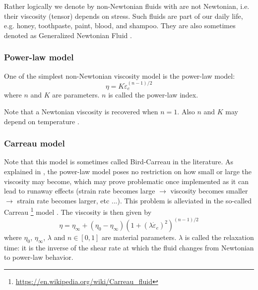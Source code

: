 Rather logically we denote by non-Newtonian fluids with are not Newtonian, i.e. their viscosity (tensor)
depends on stress. Such fluids are part of our daily life, e.g. honey, toothpaste, paint, blood, and shampoo.
They are also sometimes denoted as Generalized Newtonian Fluid . 
 


\subsubsection{Power-law model} 

One of the simplest non-Newtonian viscosity model is the power-law model:
\begin{equation}
\eta = K \dot{\varepsilon}_{e}^{(n-1)/2}
\end{equation}
where $n$ and $K$ are parameters. $n$ is called the power-law index.

Note that a Newtonian viscosity is recovered when $n=1$. Also $n$ and $K$ may depend on temperature
\cite[p339]{reddybook2}.

\Literature \cite{enmo97}

\subsubsection{Carreau model}

Note that this model is sometimes called Bird-Carreau in the literature. 
As explained in \cite{reddybook2}, the power-law model poses no restriction on 
how small or large the viscosity may become, which may prove problematic once 
implemented as it can lead to runaway effects (strain rate becomes large $\rightarrow$
viscosity becomes smaller $\rightarrow$ strain rate becomes larger, etc ...).
This problem is alleviated in the so-called Carreau
\footnote{\url{https://en.wikipedia.org/wiki/Carreau_fluid}} model \cite{zifr07}. 
The viscosity is then given by
\begin{equation}
\eta = \eta_\infty + (\eta_0-\eta_\infty) \left(1 + (\lambda \dot{\varepsilon}_{e})^2 \right)^{(n-1)/2}
\end{equation}
where $\eta_0$, $\eta_\infty$, $\lambda$ and $n\in[0,1]$ are material parameters. 
$\lambda$ is called the relaxation time: it is the inverse of the shear rate at which 
the fluid changes from Newtonian to power-law behavior.

